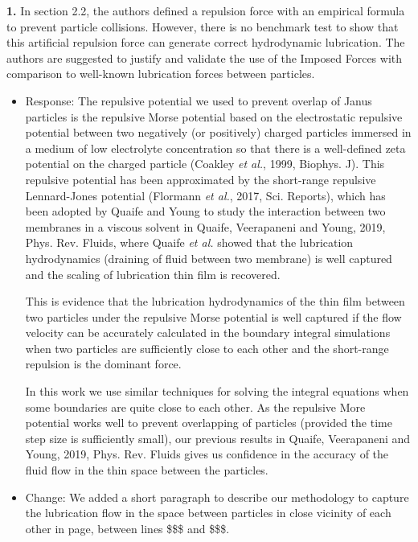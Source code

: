 \documentclass[11pt]{article}
\newcommand{\comment}[1]{{\color{blue} #1}}
\begin{document}
\noindent
\comment{{\bf 1.} In section 2.2, the authors defined a repulsion force with an
empirical formula to prevent particle collisions. However, there is no
benchmark test to show that this artificial repulsion force can generate
correct hydrodynamic lubrication. The authors are suggested to justify
and validate the use of the Imposed Forces with comparison to well-known
lubrication forces between particles.}
\begin{itemize}
  \item Response: The repulsive potential we used to prevent overlap of Janus particles is the repulsive Morse potential based on the electrostatic repulsive potential between two negatively (or positively) charged particles immersed in a medium of low electrolyte concentration so that there is a well-defined zeta potential on the charged particle (Coakley {\sl et al.}, 1999, Biophys. J). This repulsive potential has been approximated by the short-range repulsive Lennard-Jones potential (Flormann {\sl et al.}, 2017, Sci. Reports), which has been adopted by Quaife and Young to study the interaction between two membranes in a viscous solvent in Quaife, Veerapaneni and Young, 2019, Phys. Rev. Fluids, where Quaife {\sl et al.} showed that the lubrication hydrodynamics (draining of fluid between two membrane) is well captured and the scaling of lubrication thin film is recovered. 
  
This is evidence that the lubrication hydrodynamics of the thin film between two particles under the repulsive Morse potential is well captured  if the flow velocity can be accurately calculated in the boundary integral simulations when two particles are sufficiently close to each other and the short-range repulsion is the dominant force. 

In this work we use similar techniques for solving the integral equations when some boundaries are quite close to each other.  As the repulsive More potential works well to prevent overlapping of particles (provided the time step size is sufficiently small), our previous results in Quaife, Veerapaneni and Young, 2019, Phys. Rev. Fluids gives us confidence in the accuracy of the fluid flow in the thin space between the particles.

\item Change: We added a short paragraph to describe our methodology to capture the lubrication flow in the space between particles in close vicinity of each other in page, between lines \$\$\$ and \$\$\$.

\end{itemize}
\end{document}
